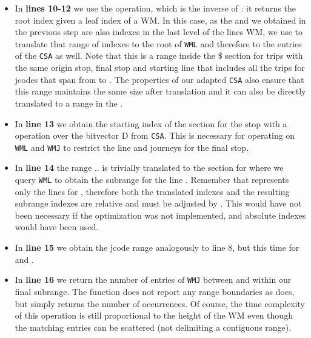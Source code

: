 \documentclass[runningheads]{llncs}
\begin{document}
\begin{itemize}
    \item In \textbf{lines 10-12} we use the  operation, which is the inverse of : it returns the root index given a leaf index of a WM. In this case, as the  and  we obtained in the previous step are also indexes in the last level of the lines WM, we use  to translate that range of indexes to the root of \texttt{WML} and therefore to the entries of the \texttt{CSA} as well. Note that this is a range inside the $\$$ section for trips with the same origin stop, final stop and starting line that includes all the trips for jcodes that span from  to . The properties of our adapted \texttt{CSA} also ensure that this range maintains the same size after translation and it can also be directly translated to a range in the .
    
    \item In \textbf{line 13} we obtain the starting index of the section for the stop  with a  operation over the bitvector D from \texttt{CSA}. This is necessary for operating on \texttt{WML} and \texttt{WMJ} to restrict the line and journeys for the final stop.
    
    \item In \textbf{line 14} the range $..$ is trivially translated to the section for  where we query \texttt{WML} to obtain the subrange for the line . Remember that  represents only the lines for , therefore both the translated indexes and the resulting subrange indexes are relative and must be adjusted by . This would have not been necessary if the optimization was not implemented, and absolute indexes would have been used.
    
    \item In \textbf{line 15} we obtain the jcode range analogously to line 8, but this time for  and .
    
    \item In \textbf{line 16} we return the number of entries of \texttt{WMJ} between  and  within our final subrange. The function  does not report any range boundaries as  does, but simply returns the number of occurrences. Of course, the time complexity of this operation is still proportional to the height of the WM even though the matching entries can be scattered (not delimiting a contiguous range).
\end{itemize}
\end{document}
